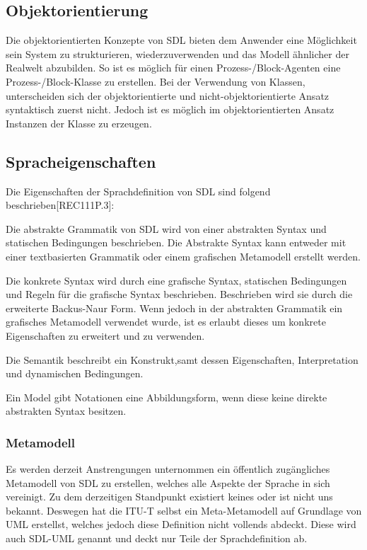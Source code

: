 \subsection{Objektorientierung} 
\label{ssc:Vererbung}
Die objektorientierten Konzepte von \ac{SDL} bieten dem Anwender eine Möglichkeit sein System zu strukturieren, wiederzuverwenden und das Modell ähnlicher der Realwelt abzubilden. So ist es möglich für einen Prozess-/Block-Agenten eine Prozess-/Block-Klasse zu erstellen.
Bei der Verwendung von Klassen, unterscheiden sich der objektorientierte und nicht-objektorientierte Ansatz syntaktisch zuerst nicht. Jedoch ist es möglich im objektorientierten Ansatz Instanzen der Klasse zu erzeugen.

\subsection{Spracheigenschaften}
\label{ssc:Spracheigenschaften}
Die Eigenschaften der Sprachdefinition von \ac{SDL} sind folgend beschrieben[REC111P.3]:
\begin{itemize}{
		\item[Abstrakte Grammatik] Die abstrakte Grammatik von \ac{SDL} wird von einer abstrakten Syntax und  statischen Bedingungen 
		beschrieben. Die Abstrakte Syntax kann entweder mit einer textbasierten Grammatik oder einem grafischen Metamodell erstellt werden.
		
		\item[Konkrete Grammatik] Die konkrete Syntax wird durch eine grafische Syntax, statischen Bedingungen und Regeln für die grafische Syntax beschrieben.
		Beschrieben wird sie durch die erweiterte Backus-Naur Form. Wenn jedoch in der abstrakten Grammatik ein 
		grafisches Metamodell verwendet wurde, ist es erlaubt dieses um konkrete Eigenschaften zu erweitert und zu verwenden.
		
		\item[Semantik] Die Semantik beschreibt ein Konstrukt,samt dessen Eigenschaften, Interpretation und dynamischen Bedingungen.
		
		\item[Model] Ein Model gibt Notationen eine Abbildungsform, wenn diese keine direkte abstrakten Syntax besitzen.
}\end{itemize}

\subsubsection{Metamodell}
\label{ssc:Metamodell}
Es werden derzeit Anstrengungen unternommen ein öffentlich zugängliches Metamodell von \ac{SDL} zu erstellen, welches alle Aspekte der Sprache in sich vereinigt. Zu dem derzeitigen Standpunkt existiert keines oder ist nicht uns bekannt. Deswegen hat die \ac{ITU-T} selbst ein Meta-Metamodell auf Grundlage von 
\ac{UML} erstellst, welches jedoch diese Definition nicht vollends abdeckt. Diese wird auch SDL-UML genannt und deckt nur Teile der Sprachdefinition ab.

